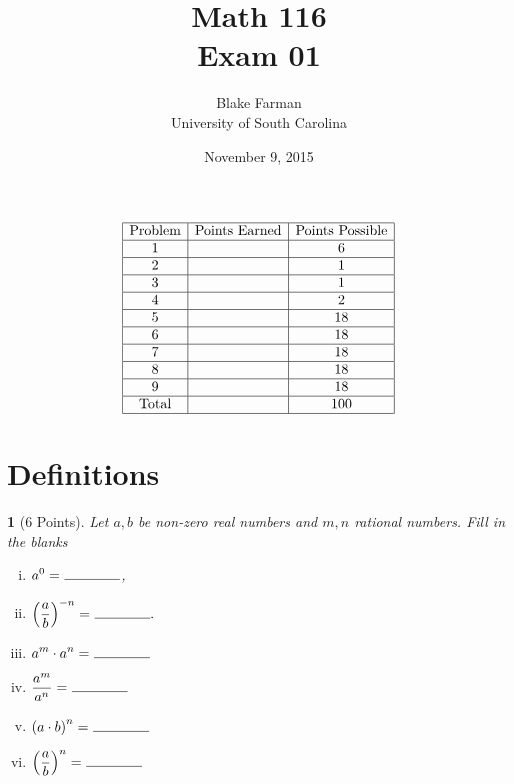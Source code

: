 \documentclass[12pt]{amsart}
\author{Blake Farman\\University of South Carolina}
\title{Math 116\\Exam 01}
\date{November 9, 2015}
\begin{document}
\maketitle

\begin{center}
\end{center}

\vspace{0.2in}
\vspace{0.2in}

$$
\begin{array}{|c|c|c|}
  \hline
  \text{Problem} & \text{Points Earned} & \text{Points Possible}\\
  \hline
  1 & & 6\\
  \hline
  2 & & 1\\
  \hline
  3 & & 1\\
  \hline
  4 & & 2\\
  \hline
  5 & & 18 \\
  \hline
  6 & & 18\\
  \hline
  7 & & 18\\
  \hline
  8 & & 18\\
  \hline
  9 & & 18\\
  \hline
  \text{Total} & & 100\\
  \hline
\end{array}
$$

\newpage
\theoremstyle{plain}
\newtheorem{thm}{}
\newtheorem{lem}{Lemma}
\theoremstyle{definition}
\newtheorem{defn}{Definition}

\section{Definitions}

\begin{thm}[6 Points]\label{ex2}
  Let $a, b$ be non-zero real numbers and $m, n$ rational numbers.
  Fill in the blanks
  \begin{enumerate}[(i)]
  \item
    $\displaystyle{a^0 =\ \line(1,0){40}}$,
  \item
    $\displaystyle{\left(\frac{a}{b}\right)^{-n} =\ \line(1,0){40}}.$
  \item
    $\displaystyle{a^m \cdot a^n =\ \line(1,0){40}}$
  \item
    $\displaystyle{\frac{a^m}{a^n} =\ \line(1,0){40}}$
  \item
    $\displaystyle{\left(a \cdot b\right)^n =\ \line(1,0){40}}$
  \item
    $\displaystyle{\left(\frac{a}{b}\right)^n =\ \line(1,0){40}}$
  \end{enumerate}
\end{thm}
\end{document}
